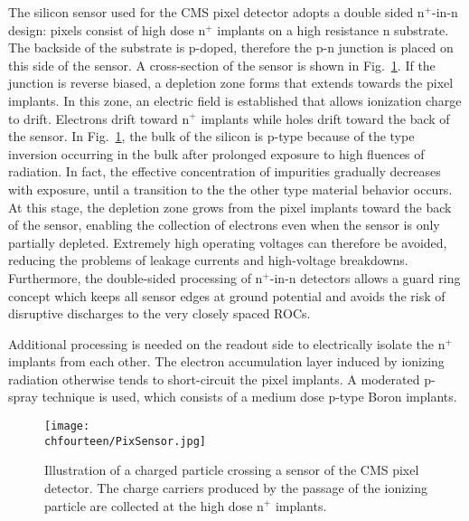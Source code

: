 The silicon sensor used for the CMS pixel detector adopts a double sided n$^+$-in-n design: pixels consist of high dose n$^+$ implants on a high resistance n substrate.
The backside of the substrate is p-doped, therefore the p-n junction is placed on this side of the sensor. A cross-section of the sensor is shown in Fig.~\ref{fig:PixSensor}.
If the junction is reverse biased, a depletion zone forms that extends towards the pixel implants. In this zone, an electric field is established that allows ionization charge to drift.
Electrons drift toward n$^+$ implants while holes drift toward the back of the sensor.
In Fig.~\ref{fig:PixSensor}, the bulk of the silicon is p-type because of the type inversion occurring in the bulk after prolonged exposure to high fluences of radiation.
In fact, the effective concentration of impurities gradually decreases with exposure, until a transition to the the other type material behavior occurs.
At this stage, the depletion zone grows from the pixel implants toward the back of the sensor, enabling the collection of electrons even when the sensor is only partially depleted.
Extremely high operating voltages can therefore be avoided, reducing the problems of leakage currents and high-voltage breakdowns.
Furthermore, the double-sided processing of n$^+$-in-n detectors allows a guard ring concept which keeps all sensor edges at ground potential
and avoids the risk of disruptive discharges to the very closely spaced ROCs.

Additional processing is needed on the readout side to electrically isolate the n$^+$ implants from each other.
The electron accumulation layer induced by ionizing radiation otherwise tends to short-circuit the pixel implants.
A moderated p-spray technique is used, which consists of a medium dose p-type Boron implants.\\

\begin{figure}[!htb]
 \begin{center}
 \texttt{[image: \\chfourteen/PixSensor.jpg]}
 \end{center}
 \caption{Illustration of a charged particle crossing a sensor of the CMS pixel detector. The charge carriers produced by the passage of the ionizing particle are collected at the high dose n$^+$ implants.}
 \label{fig:PixSensor}
\end{figure}

